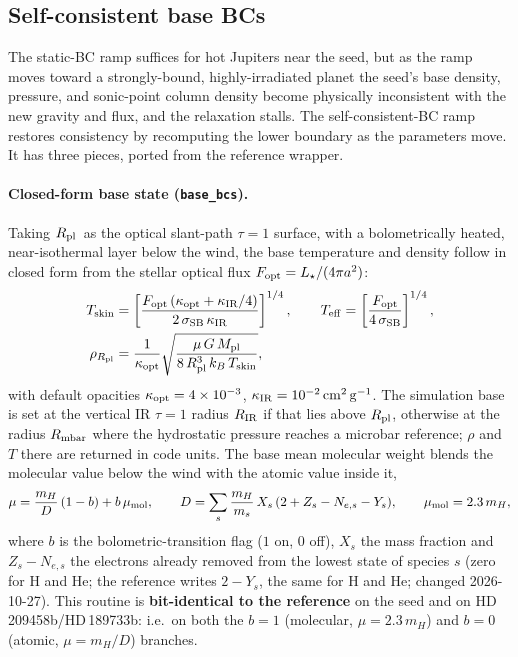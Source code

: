\documentclass[english,a4paper]{my_memo}
\newcommand{\Rp}{\ensuremath{R_{\rm pl}}}
\newcommand{\code}[1]{\texttt{#1}}
\begin{document}
\subsection{Self-consistent base BCs}\label{sec:c2}
The static-BC ramp suffices for hot Jupiters near the seed, but as the
ramp moves toward a strongly-bound, highly-irradiated planet the seed's
base density, pressure, and sonic-point column density become physically
inconsistent with the new gravity and flux, and the relaxation stalls.
The self-consistent-BC ramp restores consistency by recomputing the lower boundary as the
parameters move. It has three pieces, ported from the reference wrapper.

\paragraph{Closed-form base state (\code{base\_bcs}).} Taking \Rp\ as the
optical slant-path $\tau=1$ surface, with a bolometrically heated,
near-isothermal layer below the wind, the base temperature and density
follow in closed form from the stellar optical flux
$F_{\rm opt}=L_\star/(4\pi a^2)$:
\begin{align}
T_{\rm skin} &= \left[\frac{F_{\rm opt}\,(\kappa_{\rm opt}+\kappa_{\rm IR}/4)}
   {2\,\sigma_{\rm SB}\,\kappa_{\rm IR}}\right]^{1/4}, \qquad
T_{\rm eff} = \left[\frac{F_{\rm opt}}{4\,\sigma_{\rm SB}}\right]^{1/4},\\
\rho_{R_{\rm pl}} &= \frac{1}{\kappa_{\rm opt}}
   \sqrt{\frac{\mu\,G\,M_{\rm pl}}{8\,R_{\rm pl}^3\,k_B\,T_{\rm skin}}},
\end{align}
with default opacities $\kappa_{\rm opt}=4\times10^{-3}$,
$\kappa_{\rm IR}=10^{-2}\,{\rm cm^2\,g^{-1}}$. The simulation base is set at
the vertical IR $\tau=1$ radius $R_{\rm IR}$ if that lies above \Rp,
otherwise at the radius $R_{\rm mbar}$ where the hydrostatic pressure
reaches a microbar reference; $\rho$ and $T$ there are returned in code
units. The base mean molecular weight blends the molecular value below the
wind with the atomic value inside it,
\[
\mu = \frac{m_H}{D}\,(1-b) + b\,\mu_{\rm mol}, \qquad
D = \sum_s \frac{m_H}{m_s}\,X_s\,(2+Z_s-N_{e,s}-Y_s), \qquad \mu_{\rm mol}=2.3\,m_H,
\]
where $b$ is the bolometric-transition flag ($1$ on, $0$ off), $X_s$ the
mass fraction and $Z_s-N_{e,s}$ the electrons already removed from the
lowest state of species $s$ (zero for H and He; the reference writes
$2-Y_s$, the same for H and He; changed 2026-10-27). This routine is \textbf{bit-identical to the reference} on
the seed and on HD\,209458b/HD\,189733b: i.e.\ on both the $b=1$
(molecular, $\mu=2.3\,m_H$) and $b=0$ (atomic, $\mu=m_H/D$) branches.
\end{document}
